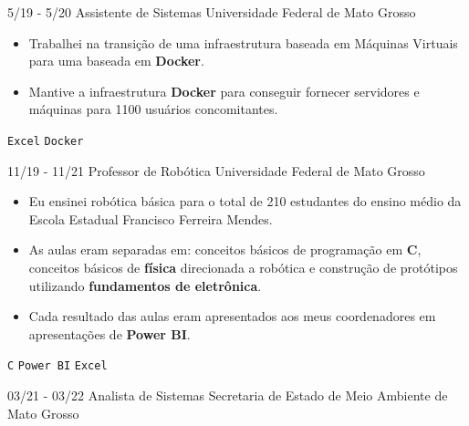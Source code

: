 \documentclass[9pt]{developercv}
\begin{document}
\vspace{-10 pt}
\begin{entrylist}
	\entry
            {5/19 - 5/20}
		{\normalsize Assistente de Sistemas}
		{\normalsize Universidade Federal de Mato Grosso}
		{\vspace{-10pt}
        \vspace{0.25pt}
        \begin{itemize}[noitemsep,topsep=0pt,parsep=0pt,partopsep=0pt, leftmargin=-1pt]
            \item {Trabalhei na transição de uma infraestrutura baseada em Máquinas Virtuais para uma baseada em \textbf{Docker}.}
            \vspace{0.25pt}
            \item {Mantive a infraestrutura \textbf{Docker} para conseguir fornecer servidores e máquinas para 1100 usuários concomitantes.}
        \end{itemize} 
        \texttt{Excel} \slashsep \texttt{Docker}}
	\entry
            {11/19 - 11/21}
		{\normalsize Professor de Robótica}
		{\normalsize Universidade Federal de Mato Grosso}
		{\vspace{-10pt}
        \vspace{0.25pt}
        \begin{itemize}[noitemsep,topsep=0pt,parsep=0pt,partopsep=0pt, leftmargin=-1pt]
            \item {Eu ensinei robótica básica para o total de 210 estudantes do ensino médio da Escola Estadual Francisco Ferreira Mendes.}
            \vspace{0.25pt}
            \item {As aulas eram separadas em: conceitos básicos de programação em \textbf{C}, conceitos básicos de \textbf{física} direcionada a robótica e construção de protótipos utilizando \textbf{fundamentos de eletrônica}.}
            \vspace{0.25pt}
            \item {Cada resultado das aulas eram apresentados aos meus coordenadores em apresentações de \textbf{Power BI}.}
        \end{itemize} 
        \texttt{C} \slashsep \texttt{Power BI} \slashsep \texttt{Excel}}
        \entry
		{03/21 - 03/22}
		{\normalsize Analista de Sistemas}
		{\normalsize Secretaria de Estado de Meio Ambiente de Mato Grosso}
		{\vspace{-10pt}
        \vspace{0.25pt}
}
\end{entrylist}
\end{document}
